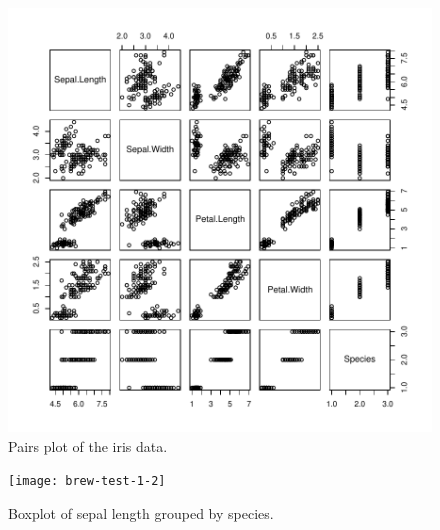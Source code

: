 \documentclass[a4paper]{article}
\begin{document}
\begin{figure}[htbp]
  \begin{center}
\includegraphics{brew-test-1-1}
    \caption{Pairs plot of the iris data.}
  \end{center}
\end{figure}


\begin{figure}[htbp]
  \begin{center}
\texttt{[image: brew-test-1-2]}
    \caption{Boxplot of sepal length grouped by species.}
  \end{center}
\end{figure}
\end{document}
